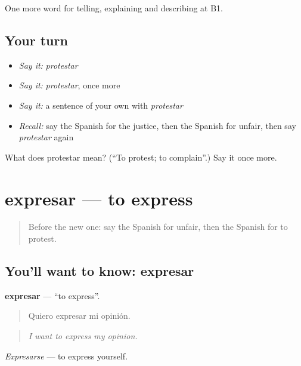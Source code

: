 \begin{grammarlens}[title={What you've built}]
One more word for telling, explaining and describing at B1.
\end{grammarlens}

\subsection*{Your turn}
\begin{itemize}
\raggedright
  \item \emph{Say it:} \emph{protestar}
  \item \emph{Say it:} \emph{protestar}, once more
  \item \emph{Say it:} a sentence of your own with \emph{protestar}
  \item \emph{Recall:} say the Spanish for the justice, then the Spanish for unfair, then say \emph{protestar} again
\end{itemize}

\begin{tcolorbox}[breakable,colback=teal!4,colframe=teal!35!black,title={Before you move on}]
What does protestar mean? (\textquotedblleft{}To protest; to complain\textquotedblright{}.) Say it once more.
\end{tcolorbox}
\section[expresar]{expresar — to express}

\label{lesson:ES-C604-expresar}



\begin{quote}
Before the new one: say the Spanish for unfair, then the Spanish for to protest.
\end{quote}

\subsection*{You'll want to know: expresar}
\textbf{expresar} — \textquotedblleft{}to express\textquotedblright{}.

\begin{quote}
Quiero expresar mi opinión.
\end{quote}

\begin{quote}
\emph{I want to express my opinion.}
\end{quote}

\emph{Expresarse} — to express yourself.

